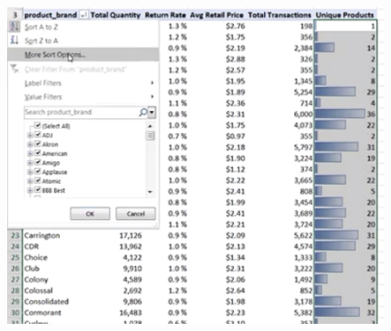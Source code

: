 \begin{figure}[H]
	\centering
	\includegraphics[scale = 0.3]{attachment/chapter_1/screenshot091}
	\caption{}
	\label{fig:screenshot091}
\end{figure} 

